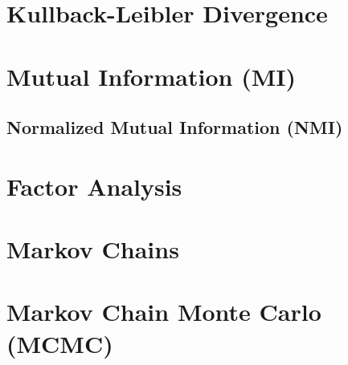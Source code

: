 \section{Kullback-Leibler Divergence}
\label{stats:kld}

\section{Mutual Information (MI)}
\label{stats:MI}

\subsection{Normalized Mutual Information (NMI)}
\label{stats:MI:normalized}

\section{Factor Analysis}
\label{stats:factor_ana}

\section{Markov Chains}
\label{misc:markov_chains}

\section{Markov Chain Monte Carlo (MCMC)}
\label{misc:MCMC}

\subsection{\pymcThree}%
\label{misc:MCMC:PyMC3}

